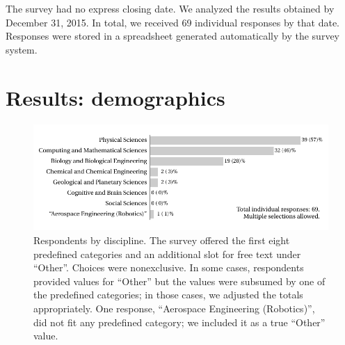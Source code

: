 \documentclass{casicswhitepaper}
\newcommand{\totalrespondents}{69\xspace}
\begin{document}
The survey had no express closing date.  We analyzed the results obtained by December 31, 2015.  In total, we received \totalrespondents individual responses by that date.  Responses were stored in a spreadsheet generated automatically by the survey system.


\section{Results: demographics}
\label{demographics}

%
%
%
%
%

\begin{figure}[b]
  \vspace*{-2ex}
  \centering
  \includegraphics{files/plots/respondents-by-discipline.pdf}
  \vspace*{-3ex}
  \caption{Respondents by discipline.  The survey offered the first eight predefined categories and an additional slot for free text under ``Other''.  Choices were nonexclusive.  In some cases, respondents provided values for ``Other'' but the values were subsumed by one of the predefined categories; in those cases, we adjusted the totals appropriately.  One response, ``Aerospace Engineering (Robotics)'', did not fit any predefined category; we included it as a true ``Other'' value.}
  \label{disciplines}
\end{figure}
\end{document}
